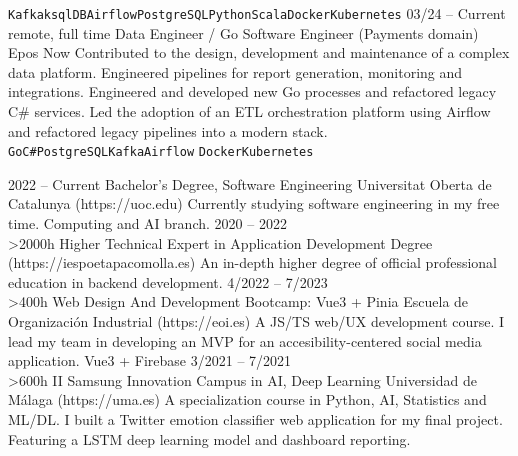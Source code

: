\documentclass[10pt]{developercv} %
\begin{document}
\begin{entrylist}
{		\texttt{Kafka}\slashsep\texttt{ksqlDB}\slashsep\texttt{Airflow}\slashsep\texttt{PostgreSQL}\slashsep\texttt{Python}\slashsep\texttt{Scala}\slashsep\texttt{Docker}\slashsep\texttt{Kubernetes}}
	\entry
		{03/24 -- Current\\\footnotesize{remote, full time}}
		{Data Engineer / Go Software Engineer (Payments domain)}
		{Epos Now}
		{
			Contributed to the design, development and maintenance of a complex data platform.
			Engineered pipelines for report generation, monitoring and integrations. Engineered and developed new Go processes and refactored legacy C\# services.
			Led the adoption of an ETL orchestration platform using Airflow and refactored legacy pipelines into a modern stack.
			\\
		\texttt{Go}\slashsep\texttt{C\#}\slashsep\texttt{PostgreSQL}\slashsep\texttt{Kafka}\slashsep\texttt{Airflow}
		\slashsep\texttt{Docker}\slashsep\texttt{Kubernetes}}
\end{entrylist}



\begin{entrylist}
	\entry
		{2022 -- Current}
		{Bachelor's Degree, Software Engineering}
		{Universitat Oberta de Catalunya (https://uoc.edu)}
		{Currently studying software engineering in my free time. Computing and AI branch.}
	\entry
		{2020 -- 2022\\\footnotesize{>2000h}}
		{Higher Technical Expert in Application Development Degree}
		{(https://iespoetapacomolla.es)}
		{An in-depth higher degree of official professional education in backend development.}
	\entry
	{4/2022 -- 7/2023\\\footnotesize{>400h}}
	{Web Design And Development Bootcamp: Vue3 + Pinia}
	{Escuela de Organización Industrial (https://eoi.es)}
	{A JS/TS web/UX development course. I lead my team in developing an MVP for an accesibility-centered social media application. Vue3 + Firebase}
	\entry
		{3/2021 -- 7/2021\\\footnotesize{>600h}}
		{II Samsung Innovation Campus in AI, Deep Learning}
		{Universidad de Málaga (https://uma.es)}
		{A specialization course in Python, AI, Statistics and ML/DL. I built a Twitter emotion classifier web application for my final project. Featuring a LSTM deep learning model and dashboard reporting.}
\end{entrylist}
\end{document}
